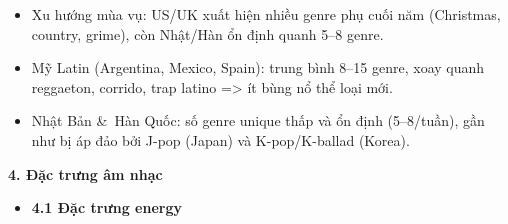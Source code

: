 \begin{itemize}
\begin{itemize}
        \item Xu hướng mùa vụ: US/UK xuất hiện nhiều genre phụ cuối năm (Christmas, country, grime), còn Nhật/Hàn ổn định quanh 5–8 genre.

        \item Mỹ Latin (Argentina, Mexico, Spain): trung bình 8–15 genre, xoay quanh reggaeton, corrido, trap latino => ít bùng nổ thể loại mới.
        \item  Nhật Bản \&\ Hàn Quốc: số genre unique thấp và ổn định (5–8/tuần), gần như bị áp đảo bởi J-pop (Japan) và K-pop/K-ballad (Korea).
    \end{itemize}
\end{itemize}


 


\textbf{4. Đặc trưng âm nhạc}
\begin{itemize}
    \item \textbf{4.1 Đặc trưng energy}
    \begin{itemize}



\end{itemize}
\end{itemize}
